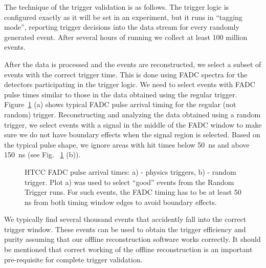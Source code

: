 The technique of the trigger validation is as follows. The trigger logic is configured exactly as it will be set in
an experiment, but it runs in ``tagging mode'', reporting trigger decisions into the data stream for every
randomly generated event. After several hours of running we collect at least 100 million events.

After the data is processed and the events are reconstructed, we select a subset of events with the correct
trigger time. This is done using FADC spectra for the detectors participating in the trigger logic. We need to
select events with FADC pulse times similar to those in the data obtained using the regular trigger.
Figure~\ref{fig:htcc_fadc} (a) shows typical FADC pulse arrival timing for the regular (not random) trigger.
Reconstructing and analyzing the data obtained using a random trigger, we select events with a signal in the middle
of the FADC window to make sure we do not have boundary effects when the signal region is selected. Based on the
typical pulse shape, we ignore areas with hit times below 50~ns and above 150~ns (see Fig. ~\ref{fig:htcc_fadc} (b)).

\begin{figure}[!htb]
	\centering
	\caption{HTCC FADC pulse arrival times: a) - physics triggers, b) - random trigger. Plot a) was used to select ``good''
          events from the Random Trigger runs. For such events, the FADC timing has to be at least 50 ns
          from both timing window edges to avoid boundary effects.}
	\label{fig:htcc_fadc}
\end{figure}

We typically find several thousand events that accidently fall into the correct trigger window. These events
can be used to obtain the trigger efficiency and purity assuming that our offline reconstruction software
works correctly. It should be mentioned that correct working of the offline reconstruction is an important
pre-requisite for complete trigger validation.


